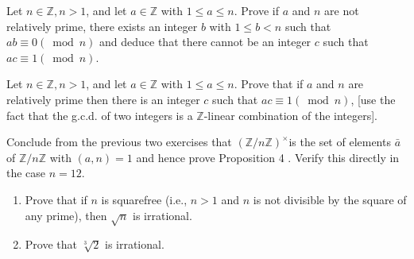 \begin{questions}
\begin{solution}
    
\end{solution}


\question
    Let \(n \in \mathbb{Z}, n>1\), and let \(a \in \mathbb{Z}\) with \(1 \leq a \leq n\). Prove if \(a\) and \(n\) are not relatively prime, there exists an integer \(b\) with \(1 \leq b<n\) such that \(a b \equiv 0(\bmod n)\) and deduce that there cannot be an integer \(c\) such that \(a c \equiv 1(\bmod n)\).


\begin{solution}
    
\end{solution}


\question
    Let \(n \in \mathbb{Z}, n>1\), and let \(a \in \mathbb{Z}\) with \(1 \leq a \leq n\). Prove that if \(a\) and \(n\) are relatively prime then there is an integer \(c\) such that \(a c \equiv 1(\bmod n)\), [use the fact that the g.c.d. of two integers is a \(\mathbb{Z}\)-linear combination of the integers].



\begin{solution}
    
\end{solution}


\question
    Conclude from the previous two exercises that \((\mathbb{Z} / n \mathbb{Z})^{\times}\)is the set of elements \(\bar{a}\) of \(\mathbb{Z} / n \mathbb{Z}\) with \((a, n)=1\) and hence prove Proposition 4 . Verify this directly in the case \(n=12\).




\begin{solution}
    
\end{solution}


\question
    \begin{enumerate}[label=(\alph*)]
        \item Prove that if \(n\) is squarefree (i.e., \(n>1\) and \(n\) is not divisible by the square of any prime), then \(\sqrt{n}\) is irrational.
        \item Prove that \(\sqrt[3]{2}\) is irrational.
    \end{enumerate}


\begin{solution}
    
\end{solution}



\end{questions}
